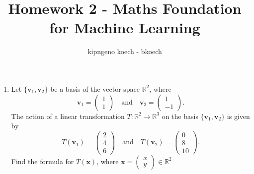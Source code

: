 \documentclass[a3paper,12pt]{extarticle} %
\begin{document}
\author{kipngeno koech - bkoech}
\title{Homework 2 - Maths Foundation for Machine Learning}   
\maketitle

\medskip

\begin{enumerate}
    \item Let \(\{ \mathbf{v}_1, \mathbf{v}_2 \}\) be a basis of the vector space \(\mathbb{R}^2\), where
    \[
    \mathbf{v}_1 = \begin{pmatrix} 1 \\ 1 \end{pmatrix} \quad \text{and} \quad \mathbf{v}_2 = \begin{pmatrix} 1 \\ -1 \end{pmatrix}.
    \]
    The action of a linear transformation \(T : \mathbb{R}^2 \to \mathbb{R}^3\) on the basis \(\{ \mathbf{v}_1, \mathbf{v}_2 \}\) is given by
    \[
    T(\mathbf{v}_1) = \begin{pmatrix} 2 \\ 4 \\ 6 \end{pmatrix} \quad \text{and} \quad T(\mathbf{v}_2) = \begin{pmatrix} 0 \\ 8 \\ 10 \end{pmatrix}.
    \]
    Find the formula for \(T(\mathbf{x})\), where \(\mathbf{x} = \begin{pmatrix} x \\ y \end{pmatrix} \in \mathbb{R}^2\)


\end{enumerate}
\end{document}

